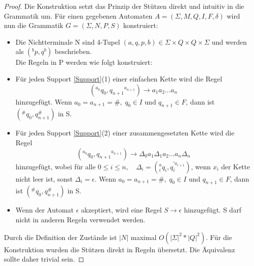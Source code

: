 \begin{proof}
Die Konstruktion setzt das Prinzip der Stützen direkt und intuitiv in die Grammatik um.
Für einen gegebenen Automaten $A=(\Sigma, M, Q, I, F, \delta)$ wird nun die Grammatik $G=(\Sigma, N, P, S)$ konstruiert:
\begin{itemize}
\item Die Nichtterminale N sind 4-Tupel $(a,q,p,b)\in \Sigma \times Q \times Q \times \Sigma$ und werden als $(^bp,q^b)$ beschrieben. \\
Die Regeln in P werden wie folgt konstruiert:
\item
Für jeden Support \autoref{Support}(1) einer einfachen Kette wird die Regel 
\begin{equation}
(^{a_0} q_0, q_{n+1} \phantom{}^{a_{n+1}})\rightarrow a_1a_2...a_n
\end{equation}
hinzugefügt. Wenn $a_0=a_{n+1}=\#, \; q_0 \in I$ und $q_{n+1} \in F$, dann ist $(^\#q_0,q_{n+1}^\#)$ in S.
\item
Für jeden Support \autoref{Support}(2) einer zusammengesetzten Kette wird die Regel 
\begin{equation}
(^{a_0}q_0, q_{n+1} \phantom{}^{a_{n+1}})\rightarrow \Delta_0a_1\Delta_1a_2...a_n\Delta_n
\end{equation}
hinzugefügt, wobei für alle $0 \leq i \leq n, \quad \Delta_i = (^a_i q_i, q_i^{\prime a_{i+1}})$, wenn $x_i$ der Kette nicht leer ist, sonst $\Delta_i = \epsilon$. Wenn $a_0=a_{n+1}=\#, \; q_0 \in I$ und $q_{n+1} \in F$, dann ist $(^\#q_0,q_{n+1}^\#)$ in S.
\item
Wenn der Automat $\epsilon$ akzeptiert, wird eine Regel $S\rightarrow \epsilon$ hinzugefügt. S darf nicht in anderen Regeln verwendet werden.
\end{itemize}
Durch die Definition der Zustände ist $|N|$ maximal $O(|\Sigma|^2 * |Q|^2)$.
Für die Konstruktion wurden die Stützen direkt in Regeln übersetzt. Die Äquivalenz sollte daher trivial sein.


\end{proof}

